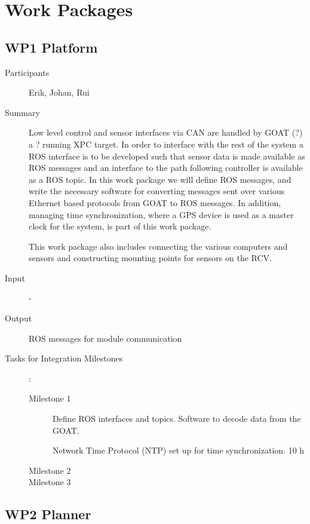 \documentclass[11pt,a4paper]{article}
\begin{document}
\section{Work Packages}

\subsection{WP1 Platform} %

\begin{description}
\item[Participants] Erik, Johan, Rui
\item[Summary] Low level control and sensor interfaces via CAN are
  handled by GOAT (?)  a ? running XPC target. In order to interface
  with the rest of the system a ROS interface is to be developed such
  that sensor data is made available as ROS messages and an interface
  to the path following controller is available as a ROS topic. In this
  work package we will define ROS messages, and write the necessary
  software for converting messages sent over various Ethernet based
  protocols from GOAT to ROS messages. In addition, managing time
  synchronization, where a GPS device is used as a master clock for the
  system, is part of this work package.

  This work package also includes connecting the various computers and
  sensors and constructing mounting points for sensors on the RCV.
   
\item[Input] -
\item[Output] ROS messages for module communication
\item[Tasks for Integration Milestones]:\
	\begin{description}
		\item[Milestone 1] Define ROS interfaces and topics. Software to decode data from the GOAT. 

  Network Time Protocol (NTP) set up for time synchronization. 10 h
		\item[Milestone 2]
		\item[Milestone 3] 
	\end{description}	 
\end{description}

\subsection{WP2 Planner}
\end{document}
